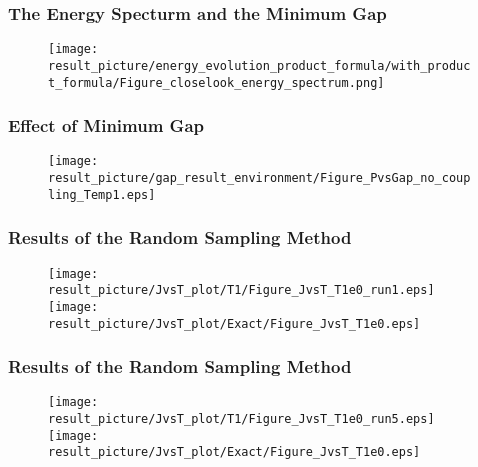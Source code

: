 \documentclass{beamer}
\begin{document}
\begin{frame}
	\frametitle{The Energy Specturm and the Minimum Gap}
	\begin{figure}
		\centering
		\texttt{[image: result\_picture/energy\_evolution\_product\_formula/with\_product\_formula/Figure\_closelook\_energy\_spectrum.png]}
		
	\end{figure}
\end{frame}

\begin{frame}
	\frametitle{Effect of Minimum Gap}

	\begin{figure}
		\centering
		\texttt{[image: result\_picture/gap\_result\_environment/Figure\_PvsGap\_no\_coupling\_Temp1.eps]}
		
	\end{figure}
\end{frame}

\begin{frame}
	\frametitle{Results of the Random Sampling Method}
	\begin{figure}
		\centering
		\texttt{[image: result\_picture/JvsT\_plot/T1/Figure\_JvsT\_T1e0\_run1.eps]}
		\hfill
		\texttt{[image: result\_picture/JvsT\_plot/Exact/Figure\_JvsT\_T1e0.eps]}		
		
	\end{figure}
\end{frame}

\begin{frame}
	\frametitle{Results of the Random Sampling Method}
	\begin{figure}
		\centering
		\texttt{[image: result\_picture/JvsT\_plot/T1/Figure\_JvsT\_T1e0\_run5.eps]}
		\hfill
		\texttt{[image: result\_picture/JvsT\_plot/Exact/Figure\_JvsT\_T1e0.eps]}		
		
	\end{figure}
\end{frame}
\end{document}
